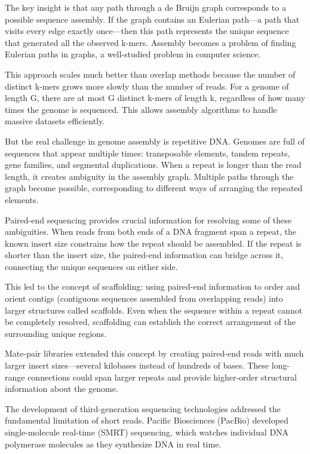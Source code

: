 The key insight is that any path through a de Bruijn graph corresponds to a possible sequence assembly. If the graph contains an Eulerian path—a path that visits every edge exactly once—then this path represents the unique sequence that generated all the observed k-mers. Assembly becomes a problem of finding Eulerian paths in graphs, a well-studied problem in computer science.

This approach scales much better than overlap methods because the number of distinct k-mers grows more slowly than the number of reads. For a genome of length G, there are at most G distinct k-mers of length k, regardless of how many times the genome is sequenced. This allows assembly algorithms to handle massive datasets efficiently.

But the real challenge in genome assembly is repetitive DNA. Genomes are full of sequences that appear multiple times: transposable elements, tandem repeats, gene families, and segmental duplications. When a repeat is longer than the read length, it creates ambiguity in the assembly graph. Multiple paths through the graph become possible, corresponding to different ways of arranging the repeated elements.

Paired-end sequencing provides crucial information for resolving some of these ambiguities. When reads from both ends of a DNA fragment span a repeat, the known insert size constrains how the repeat should be assembled. If the repeat is shorter than the insert size, the paired-end information can bridge across it, connecting the unique sequences on either side.

This led to the concept of scaffolding: using paired-end information to order and orient contigs (contiguous sequences assembled from overlapping reads) into larger structures called scaffolds. Even when the sequence within a repeat cannot be completely resolved, scaffolding can establish the correct arrangement of the surrounding unique regions.

Mate-pair libraries extended this concept by creating paired-end reads with much larger insert sizes—several kilobases instead of hundreds of bases. These long-range connections could span larger repeats and provide higher-order structural information about the genome.

The development of third-generation sequencing technologies addressed the fundamental limitation of short reads. Pacific Biosciences (PacBio) developed single-molecule real-time (SMRT) sequencing, which watches individual DNA polymerase molecules as they synthesize DNA in real time.


